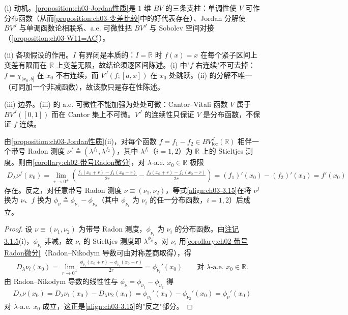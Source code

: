 \documentclass[../../main.tex]{subfiles}%
\begin{document}
\begin{remark}\label{remark:ch03-Jordan性质动机}
(i) 动机。\cref{proposition:ch03-Jordan性质}是 $1$ 维 $BV$ 的三条支柱：单调性使 $V$ 可作分布函数（从而\cref{proposition:ch03-变差比较}中的好代表存在）、Jordan 分解使 $BV^J$ 与单调函数论相联系、a.e. 可微性把 $BV^J$ 与 Sobolev 空间对接（\cref{proposition:ch03-W11=AC}）。

(ii) 各项假设的作用。$I$ 有界闭是本质的：$I=\mathbb{R}$ 时 $f(x)=x$ 在每个紧子区间上变差有限而在 $\mathbb{R}$ 上变差无限，故结论须逐区间陈述。(i) 中"$f$ 右连续"不可去掉：$f=\chi_{(x_0,b]}$ 在 $x_0$ 不右连续，而 $V^J(f;[a,x])$ 在 $x_0$ 处跳跃。(ii) 的分解不唯一（可同加一个非减函数），故该款只是存在性陈述。

(iii) 边界。(iii) 的 a.e. 可微性不能加强为处处可微：Cantor--Vitali 函数 $V$ 属于 $BV^J([0,1])$ 而在 Cantor 集上不可微。$V^J$ 的连续性只保证 $V$ 是分布函数，不保证 $f$ 连续。
\end{remark}

\begin{remark}\label{remark:ch03-RN导数}
由\cref{proposition:ch03-Jordan性质}(ii)，对每个函数 $f=f_1-f_2\in BV^J_{\mathrm{loc}}(\mathbb{R})$ 相伴一个带号 Radon 测度 $\nu^f\triangleq(\lambda^{f_1},\lambda^{f_2})$，其中 $\lambda^{f_i}$（$i=1,2$）为 $\mathbb{R}$ 上的 Stieltjes 测度。则由\cref{corollary:ch02-带号Radon微分}，对 $\lambda$-a.e. $x_0\in\mathbb{R}$ 极限
\begin{align}
D_\lambda\nu^f(x_0)=\lim_{r\to0^+}\left(\frac{f_1(x_0+r)-f_1(x_0-r)}{2r}-\frac{f_2(x_0+r)-f_2(x_0-r)}{2r}\right)
=(f_1)'(x_0)-(f_2)'(x_0)=f'(x_0)\label{align:ch03-3.15}
\end{align}
存在。反之，对任意带号 Radon 测度 $\nu\equiv(\nu_1,\nu_2)$，等式\eqref{align:ch03-3.15}在将 $\nu^f$ 换为 $\nu$、$f$ 换为 $\phi_\nu\triangleq\phi_{\nu_1}-\phi_{\nu_2}$（其中 $\phi_{\nu_i}$ 为 $\nu_i$ 的任一分布函数，$i=1,2$）后成立。
\end{remark}

\begin{proof}
设 $\nu\equiv(\nu_1,\nu_2)$ 为带号 Radon 测度，$\phi_{\nu_i}$ 为 $\nu_i$ 的分布函数。由\hyperref[remark:ch03-Stieltjes]{注记 3.1.5}(i)，$\phi_{\nu_i}$ 非减，故 $\nu_i$ 的 Stieltjes 测度即 $\lambda^{\phi_{\nu_i}}$。对 $\nu_i$ 用\cref{corollary:ch02-带号Radon微分}（Radon--Nikodym 导数可由对称差商取得），得
\begin{align*}
D_\lambda\nu_i(x_0)=\lim_{r\to0^+}\frac{\phi_{\nu_i}(x_0+r)-\phi_{\nu_i}(x_0-r)}{2r}=\phi_{\nu_i}'(x_0)\qquad\text{对 }\lambda\text{-a.e. }x_0\in\mathbb{R}.
\end{align*}
由 Radon--Nikodym 导数的线性性与 $\phi_\nu=\phi_{\nu_1}-\phi_{\nu_2}$ 得
\begin{align*}
D_\lambda\nu(x_0)=D_\lambda\nu_1(x_0)-D_\lambda\nu_2(x_0)=\phi_{\nu_1}'(x_0)-\phi_{\nu_2}'(x_0)=\phi_\nu'(x_0)
\end{align*}
对 $\lambda$-a.e. $x_0$ 成立，这正是\eqref{align:ch03-3.15}的"反之"部分。
\end{proof}
\end{document}
